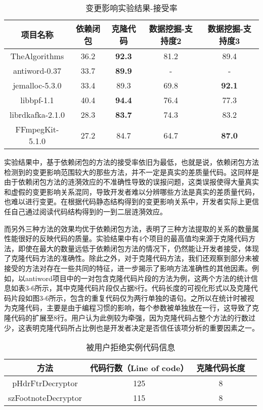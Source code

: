 \begin{table}[htbp]
\caption{变更影响实验结果-接受率}
\vspace{0.5em}\centering\wuhao
\begin{tabular}{ccccc}
\toprule
项目名称 & 依赖闭包 & 克隆代码 & 数据挖掘-支持度2 & 数据挖掘-支持度3 \\
\midrule
TheAlgorithms & 36.2 & \textbf{92.3} & 81.2 & 89.4\\
antiword-0.37 & 33.7 & \textbf{89.9} & - & -\\
jemalloc-5.3.0 & 33.4 & 89.3 & 69.8 & \textbf{92.1}\\
libbpf-1.1 & 40.4 & \textbf{94.4} & 76.4 & 77.3\\
librdkafka-2.1.0 & 28.3 & \textbf{83.7} & 74.3 & 83.2\\
FFmpegKit-5.1.0 & 27.2 & 84.7 & 64.7 & \textbf{87.0}\\

\bottomrule
\end{tabular}
\end{table}

实验结果中，基于依赖闭包的方法的接受率依旧为最低，也就是说，依赖闭包方法检测到的变更影响范围较大的那些方法，并不一定是真实的差质量代码。这同样是由于依赖闭包方法的涟漪效应的不准确性导致的误报问题，这类误报使得大量真实和虚假的变更影响关系混同，导致开发者难以分辨哪些方法是真实的差质量代码，也难以进行变更。在根据代码静态结构得到的变更影响关系中，开发者实际上更信任自己通过阅读代码结构得到的一到二层涟漪效应。

而另外三种方法的效果均优于依赖闭包方法，表明了三种方法提取的关系的数量属性能很好的反映代码的质量。实验结果中有4个项目的最高值均来源于克隆代码方法，即使在最大的数量远低于依赖闭包方法的情况下，仍然能让开发者接受，体现了克隆代码方法的准确性。除此之外，对于克隆代码方法，我们还观察到部分未被接受的方法对存在一些共同的特征，进一步揭示了影响方法准确性的其他因素。例如，以antiword项目中的一对包含克隆代码片段的方法为例，这两个方法的统计信息如表3-6所示，其中克隆代码片段仅占据8行。代码长度的可视化形式以及克隆代码片段如图3-6所示，包含的重复代码仅为两行单独的语句。之所以在统计时被视为克隆代码，主要是由于编程习惯的影响，每个参数被单独放在一行，这导致了克隆代码的扩展至8行。用户认为此例较为牵强，因为克隆代码占整个方法的行数过少，这表明克隆代码所占比例也是开发者决定是否信任该项分析的重要因素之一。

\begin{table}[htbp]
\caption{被用户拒绝实例代码信息}
\vspace{0.5em}\centering\wuhao
\begin{tabular}{cccc}
\toprule
方法 & 代码行数（Line of code）  & 克隆代码长度\\
\midrule
pHdrFtrDecryptor & 125 & 8 \\
szFootnoteDecryptor  & 115 & 8 \\
\bottomrule
\end{tabular}
\end{table}

